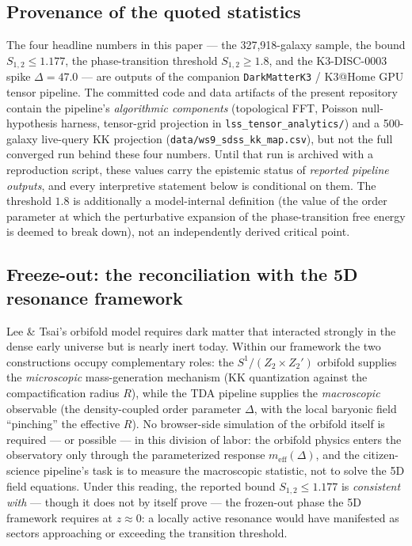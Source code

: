 \documentclass[aps,prd,twocolumn,nofootinbib,superscriptaddress,10pt]{revtex4-2}
\begin{document}
\subsection{Provenance of the quoted statistics}
The four headline numbers in this paper --- the 327,918-galaxy sample, the bound $S_{1,2} \le 1.177$, the phase-transition threshold $S_{1,2} \ge 1.8$, and the K3-DISC-0003 spike $\Delta = 47.0$ --- are outputs of the companion \texttt{DarkMatterK3} / K3@Home GPU tensor pipeline. The committed code and data artifacts of the present repository contain the pipeline's \emph{algorithmic components} (topological FFT, Poisson null-hypothesis harness, tensor-grid projection in \texttt{lss\_tensor\_analytics/}) and a 500-galaxy live-query KK projection (\texttt{data/ws9\_sdss\_kk\_map.csv}), but not the full converged run behind these four numbers. Until that run is archived with a reproduction script, these values carry the epistemic status of \emph{reported pipeline outputs}, and every interpretive statement below is conditional on them. The threshold $1.8$ is additionally a model-internal definition (the value of the order parameter at which the perturbative expansion of the phase-transition free energy is deemed to break down), not an independently derived critical point.

\subsection{Freeze-out: the reconciliation with the 5D resonance framework}
Lee \& Tsai's orbifold model requires dark matter that interacted strongly in the dense early universe but is nearly inert today. Within our framework the two constructions occupy complementary roles: the $S^1/(Z_2 \times Z_2')$ orbifold supplies the \emph{microscopic} mass-generation mechanism (KK quantization against the compactification radius $R$), while the TDA pipeline supplies the \emph{macroscopic} observable (the density-coupled order parameter $\Delta$, with the local baryonic field ``pinching'' the effective $R$). No browser-side simulation of the orbifold itself is required --- or possible --- in this division of labor: the orbifold physics enters the observatory only through the parameterized response $m_{\mathrm{eff}}(\Delta)$, and the citizen-science pipeline's task is to measure the macroscopic statistic, not to solve the 5D field equations. Under this reading, the reported bound $S_{1,2} \le 1.177$ is \emph{consistent with} --- though it does not by itself prove --- the frozen-out phase the 5D framework requires at $z \approx 0$: a locally active resonance would have manifested as sectors approaching or exceeding the transition threshold.
\end{document}
